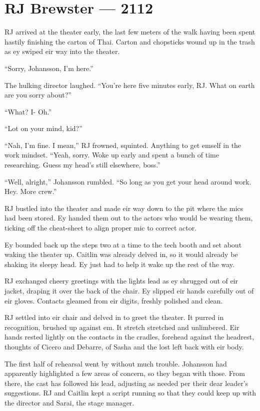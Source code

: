 \hypertarget{rj-brewster-2112}{%
\chapter*{RJ Brewster — 2112}\label{rj-brewster-2112}}

RJ arrived at the theater early, the last few meters of the walk having been spent hastily finishing the carton of Thai. Carton and chopsticks wound up in the trash as ey swiped eir way into the theater.

``Sorry, Johansson, I'm here.''

The hulking director laughed. ``You're here five minutes early, RJ. What on earth are you sorry about?''

``What? I- Oh.''

``Lot on your mind, kid?''

``Nah, I'm fine. I mean,'' RJ frowned, squinted. Anything to get emself in the work mindset. ``Yeah, sorry. Woke up early and spent a bunch of time researching. Guess my head's still elsewhere, boss.''

``Well, alright,'' Johansson rumbled. ``So long as you get your head around work. Hey. More crew.''

RJ bustled into the theater and made eir way down to the pit where the mics had been stored. Ey handed them out to the actors who would be wearing them, ticking off the cheat-sheet to align proper mic to correct actor.

Ey bounded back up the steps two at a time to the tech booth and set about waking the theater up. Caitlin was already delved in, so it would already be shaking its sleepy head. Ey just had to help it wake up the rest of the way.

RJ exchanged cheery greetings with the lights lead as ey shrugged out of eir jacket, draping it over the back of the chair. Ey slipped eir hands carefully out of eir gloves. Contacts gleamed from eir digits, freshly polished and clean.

RJ settled into eir chair and delved in to greet the theater. It purred in recognition, brushed up against em. It stretch stretched and unlimbered. Eir hands rested lightly on the contacts in the cradles, forehead against the headrest, thoughts of Cicero and Debarre, of Sasha and the lost left back with eir body.

The first half of rehearsal went by without much trouble. Johansson had apparently highlighted a few areas of concern, so they began with those. From there, the cast has followed his lead, adjusting as needed per their dear leader's suggestions. RJ and Caitlin kept a script running so that they could keep up with the director and Sarai, the stage manager.

